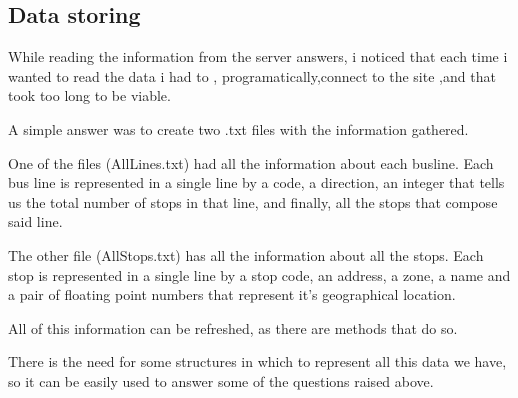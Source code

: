\documentclass[12pt]{report}
\begin{document}
\subsection{Data storing}

While reading the information from the server answers, i noticed that each time i wanted to read the data i had to , programatically,connect to the site ,and that took too long to be viable. 

A simple answer was to create two .txt files with the information gathered.

One of the files (AllLines.txt) had all the information about each busline.
Each bus line is represented in a single line by a code, a direction, an integer that tells us the total number of stops in that line, and finally, all the stops that compose said line.

The other file (AllStops.txt) has all the information about all the stops.
Each stop is represented in a single line by a stop code, an address, a zone, a name and a pair of floating point numbers that represent it's geographical location. 

All of this information can be refreshed, as there are methods that do so.

There is the need for some structures in which to represent all this data we have, so it can be easily used to answer some of the questions raised above.
\end{document}
